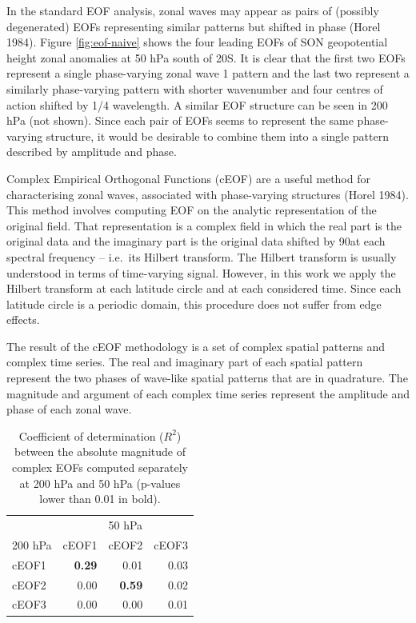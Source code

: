 \documentclass[smallextended]{svjour3}       %
\begin{document}
In the standard EOF analysis, zonal waves may appear as pairs of (possibly degenerated) EOFs representing similar patterns but shifted in phase (Horel 1984).
Figure \ref{fig:eof-naive} shows the four leading EOFs of SON geopotential height zonal anomalies at 50 hPa south of 20\degree S.
It is clear that the first two EOFs represent a single phase-varying zonal wave 1 pattern and the last two represent a similarly phase-varying pattern with shorter wavenumber and four centres of action shifted by 1/4 wavelength.
A similar EOF structure can be seen in 200 hPa (not shown).
Since each pair of EOFs seems to represent the same phase-varying structure, it would be desirable to combine them into a single pattern described by amplitude and phase.

Complex Empirical Orthogonal Functions (cEOF) are a useful method for characterising zonal waves, associated with phase-varying structures (Horel 1984).
This method involves computing EOF on the analytic representation of the original field.
That representation is a complex field in which the real part is the original data and the imaginary part is the original data shifted by 90\degree at each spectral frequency -- i.e.~its Hilbert transform.
The Hilbert transform is usually understood in terms of time-varying signal.
However, in this work we apply the Hilbert transform at each latitude circle and at each considered time.
Since each latitude circle is a periodic domain, this procedure does not suffer from edge effects.

The result of the cEOF methodology is a set of complex spatial patterns and complex time series.
The real and imaginary part of each spatial pattern represent the two phases of wave-like spatial patterns that are in quadrature.
The magnitude and argument of each complex time series represent the amplitude and phase of each zonal wave.



\begin{table}

\caption{\label{tab:corr-ceof-splitted}Coefficient of determination (\(R^2\)) between the absolute magnitude of complex EOFs computed separately at 200 hPa and 50 hPa (p-values lower than 0.01 in bold).}
\centering
\begin{tabular}[t]{l>{}r>{}r>{}r}
\toprule
\multicolumn{1}{c}{} & \multicolumn{3}{c}{50 hPa} \\
\cmidrule(l{3pt}r{3pt}){2-4}
200 hPa & cEOF1 & cEOF2 & cEOF3\\
\midrule
cEOF1 & \textbf{0.29} & 0.01 & 0.03\\
cEOF2 & 0.00 & \textbf{0.59} & 0.02\\
cEOF3 & 0.00 & 0.00 & 0.01\\
\bottomrule
\end{tabular}
\end{table}
\end{document}
